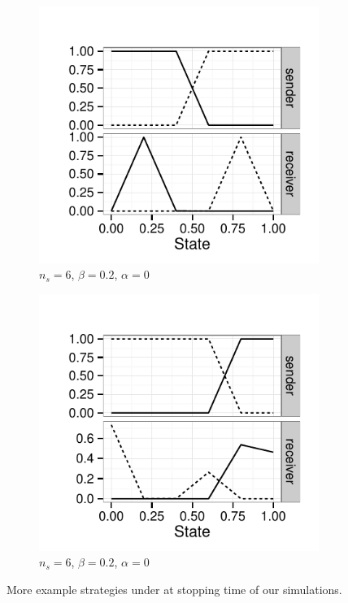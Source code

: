 \documentclass[fleqn,reqno,10pt]{article}
\newcommand{\rdd}{\acro{rdd}} %
\newcommand{\impairment}{\ensuremath{\alpha}} %
\newcommand{\toler}{\ensuremath{\beta}} %
\newcommand{\ns}{\ensuremath{n_s}} %
\begin{document}
\begin{figure}
  \centering

  \begin{subfigure}[]{0.45\textwidth}
    \includegraphics[width=\textwidth]{plots/strat_example_ind21.pdf}
    \caption{$\ns = 6$, $\toler = 0.2$, $\impairment = 0$}
    \label{fig:example_stratsC}
  \end{subfigure}
  \hfill
  \begin{subfigure}[]{0.45\textwidth}
    \includegraphics[width=\textwidth]{plots/strat_example_ind23.pdf}
    \caption{$\ns = 6$, $\toler = 0.2$, $\impairment = 0$}
    \label{fig:example_stratsD}
  \end{subfigure}

  \caption{More example strategies under \rdd at stopping time of our simulations.}
  \label{fig:MoreExample_strats}
\end{figure}
\end{document}
